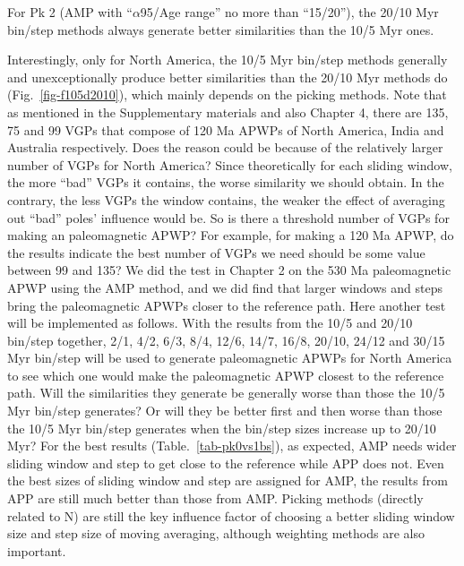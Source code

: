 For Pk 2 (AMP with ``$\alpha$95/Age range'' no more than
``15\degree/20\degree''), the 20/10 Myr bin/step methods always generate better
similarities than the 10/5 Myr ones.

Interestingly, only for North America, the 10/5 Myr bin/step methods generally
and unexceptionally produce better similarities than the 20/10 Myr methods do
(Fig.~\ref{fig-f105d2010}), which mainly depends on the picking methods. Note
that as mentioned in the Supplementary materials and also Chapter 4, there are
135, 75 and 99 VGPs that compose of 120 Ma APWPs of North America,
India and Australia respectively. Does the reason could be because of the
relatively larger number of VGPs for North America? Since theoretically for each
sliding window, the more ``bad'' VGPs it contains, the worse similarity we
should obtain. In the contrary, the less VGPs the window contains, the weaker
the effect of averaging out ``bad'' poles' influence would be. So is there a
threshold number of VGPs for making an paleomagnetic APWP\@? For example, for
making a 120 Ma APWP, do the results indicate the best number of
VGPs we need should be some value between 99 and 135? We did the test in Chapter
2 on the 530 Ma paleomagnetic APWP using the AMP method, and we did
find that larger windows and steps bring the paleomagnetic APWPs closer to the
reference path. Here another test will be implemented as follows. With the
results from the 10/5 and 20/10 bin/step together, 2/1, 4/2, 6/3, 8/4, 12/6,
14/7, 16/8, 20/10, 24/12 and 30/15 Myr bin/step will be used to generate
paleomagnetic APWPs for North America to see which one would make the
paleomagnetic APWP closest to the reference path. Will the similarities they
generate be generally worse than those the 10/5 Myr bin/step generates? Or will
they be better first and then worse than those the 10/5 Myr bin/step generates
when the bin/step sizes increase up to 20/10 Myr? For the best results
(Table.~\ref{tab-pk0vs1bs}), as expected, AMP needs wider sliding window and
step to get close to the reference while APP does not. Even the best sizes of
sliding window and step are assigned for AMP, the results from APP are still
much better than those from AMP\@. Picking methods (directly related to N) are
still the key influence factor of choosing a better sliding window size and step
size of moving averaging, although weighting methods are also important.

